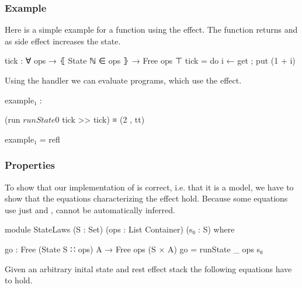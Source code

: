 \subsubsection{Example}

Here is a simple example for a function using the 
effect.
The function  returns  and
as side effect increases the state.

\begin{code}
tick : ∀ {ops} → ⦃ State ℕ ∈ ops ⦄ → Free ops ⊤
tick = do i ← get ; put (1 + i)
\end{code}
Using the  handler we can evaluate programs, which use
the  effect.

\begin{center}
\begin{code}
example₁ :
\end{code}
\begin{code}[inline]
 (run $ runState 0 $ tick >> tick) ≡ (2 , tt)
\end{code}
\begin{code}
example₁ = refl
\end{code}
\end{center}


\subsubsection{Properties}

To show that our implementation of  is correct, i.e. that it
is a model, we have to show that the equations characterizing the effect hold.
Because some equations use just  and ,
 cannot be automatically inferred.

\begin{code}
module StateLaws (S : Set) (ops : List Container) (s₀ : S) where
\end{code}
\begin{code}
  go : Free (State S ∷ ops) A → Free ops (S × A)
  go = runState {_} {ops} s₀
\end{code}
Given an arbitrary inital state  and rest effect stack
 the following equations have to hold.

